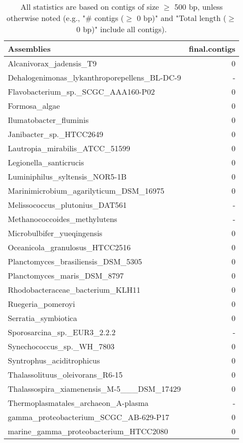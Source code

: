 \documentclass[12pt,a4paper]{article}
\begin{document}
\begin{table}[ht]
\begin{center}
\caption{All statistics are based on contigs of size $\geq$ 500 bp, unless otherwise noted (e.g., "\# contigs ($\geq$ 0 bp)" and "Total length ($\geq$ 0 bp)" include all contigs).}
\begin{tabular}{|l*{1}{|r}|}
\hline
Assemblies & final.contigs \\ \hline
Alcanivorax\_jadensis\_T9 & 0 \\ \hline
Dehalogenimonas\_lykanthroporepellens\_BL-DC-9 & - \\ \hline
Flavobacterium\_sp.\_SCGC\_AAA160-P02 & 0 \\ \hline
Formosa\_algae & 0 \\ \hline
Ilumatobacter\_fluminis & 0 \\ \hline
Janibacter\_sp.\_HTCC2649 & 0 \\ \hline
Lautropia\_mirabilis\_ATCC\_51599 & 0 \\ \hline
Legionella\_santicrucis & 0 \\ \hline
Luminiphilus\_syltensis\_NOR5-1B & 0 \\ \hline
Marinimicrobium\_agarilyticum\_DSM\_16975 & 0 \\ \hline
Melissococcus\_plutonius\_DAT561 & - \\ \hline
Methanococcoides\_methylutens & - \\ \hline
Microbulbifer\_yueqingensis & 0 \\ \hline
Oceanicola\_granulosus\_HTCC2516 & 0 \\ \hline
Planctomyces\_brasiliensis\_DSM\_5305 & 0 \\ \hline
Planctomyces\_maris\_DSM\_8797 & 0 \\ \hline
Rhodobacteraceae\_bacterium\_KLH11 & 0 \\ \hline
Ruegeria\_pomeroyi & 0 \\ \hline
Serratia\_symbiotica & 0 \\ \hline
Sporosarcina\_sp.\_EUR3\_2.2.2 & - \\ \hline
Synechococcus\_sp.\_WH\_7803 & 0 \\ \hline
Syntrophus\_aciditrophicus & 0 \\ \hline
Thalassolituus\_oleivorans\_R6-15 & 0 \\ \hline
Thalassospira\_xiamenensis\_M-5\_\_\_DSM\_17429 & 0 \\ \hline
Thermoplasmatales\_archaeon\_A-plasma & - \\ \hline
gamma\_proteobacterium\_SCGC\_AB-629-P17 & 0 \\ \hline
marine\_gamma\_proteobacterium\_HTCC2080 & 0 \\ \hline
\end{tabular}
\end{center}
\end{table}
\end{document}
